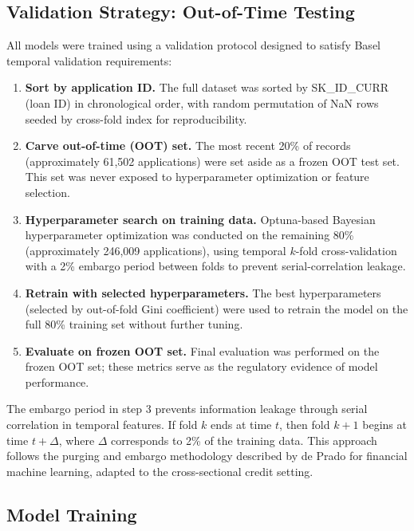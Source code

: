 \documentclass[11pt, a4paper]{article}
\begin{document}
\subsection{Validation Strategy: Out-of-Time Testing}

All models were trained using a validation protocol designed to satisfy Basel temporal validation requirements:

\begin{enumerate}
  \item \textbf{Sort by application ID.} The full dataset was sorted by SK\_ID\_CURR (loan ID) in chronological order, with random permutation of NaN rows seeded by cross-fold index for reproducibility.
  \item \textbf{Carve out-of-time (OOT) set.} The most recent 20\% of records (approximately 61,502 applications) were set aside as a frozen OOT test set. This set was never exposed to hyperparameter optimization or feature selection.
  \item \textbf{Hyperparameter search on training data.} Optuna-based Bayesian hyperparameter optimization was conducted on the remaining 80\% (approximately 246,009 applications), using temporal $k$-fold cross-validation with a 2\% embargo period between folds to prevent serial-correlation leakage.
  \item \textbf{Retrain with selected hyperparameters.} The best hyperparameters (selected by out-of-fold Gini coefficient) were used to retrain the model on the full 80\% training set without further tuning.
  \item \textbf{Evaluate on frozen OOT set.} Final evaluation was performed on the frozen OOT set; these metrics serve as the regulatory evidence of model performance.
\end{enumerate}

The embargo period in step 3 prevents information leakage through serial correlation in temporal features. If fold $k$ ends at time $t$, then fold $k+1$ begins at time $t + \Delta$, where $\Delta$ corresponds to 2\% of the training data. This approach follows the purging and embargo methodology described by de Prado \citeyear{deprado2018} for financial machine learning, adapted to the cross-sectional credit setting.

\subsection{Model Training}
\end{document}
